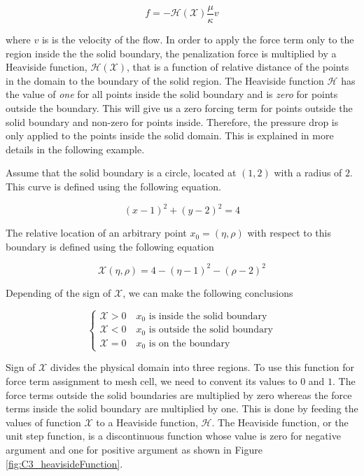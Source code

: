 \begin{equation}\label{eq:C3_forceTermIBpenelization}
	f = - \mathcal{H}(\mathcal{X}) \frac{\mu}{\kappa} v
\end{equation}

where $v$ is is the velocity of the flow. In order to apply the force term only to the region inside the the solid boundary, the penalization force is multiplied by a Heaviside function, $\mathcal{H}(\mathcal{X})$, that is a function of relative distance of the points in the domain to the boundary of the solid region. The Heaviside function $\mathcal{H}$ has the value of \emph{one} for all points inside the solid boundary and is \emph{zero} for points outside the boundary. This will give us a zero forcing term for points outside the solid boundary and non-zero for points inside. Therefore, the pressure drop is only applied to the points inside the solid domain. This is explained in more details in the following example.

Assume that the solid boundary is a circle, located at $(1,2)$ with a radius of $2$. This curve is defined using the following equation.

\begin{equation}
	(x - 1)^2 + (y - 2)^2 = 4
\end{equation}

The relative location of an arbitrary point $x_0 = (\eta, \rho)$ with respect to this boundary is defined using the following equation

\begin{equation}
	\mathcal{X}(\eta, \rho) = 4 - (\eta - 1)^2 - (\rho - 2)^2
\end{equation}

Depending of the sign of $\mathcal{X}$, we can make the following conclusions

\begin{equation}
\begin{cases}
	\mathcal{X} > 0 \quad \text{$x_0$ is inside the solid boundary} \\
	\mathcal{X} < 0 \quad \text{$x_0$ is outside the solid boundary} \\
	\mathcal{X} = 0 \quad \text{$x_0$ is on the boundary}
\end{cases}
\end{equation}

Sign of $\mathcal{X}$ divides the physical domain into three regions. To use this function for force term assignment to mesh cell, we need to convent its values to $0$ and $1$. The force terms outside the solid boundaries are multiplied by zero whereas the force terms inside the solid boundary are multiplied by one. This is done by feeding the values of function $\mathcal{X}$ to a Heaviside function, $\mathcal{H}$. The Heaviside function, or the unit step function, is a discontinuous function whose value is zero for negative argument and one for positive argument as shown in Figure \ref{fig:C3_heavisideFunction}.

